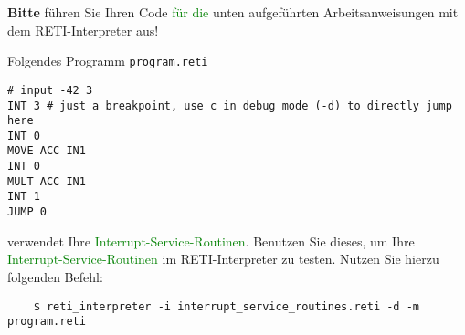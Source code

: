\documentclass{article}
\begin{document}
%



{\LARGE\bfseries\color{red}Bitte} führen Sie Ihren Code \textcolor{green}{für die} unten aufgeführten Arbeitsanweisungen mit dem RETI-Interpreter aus!

Folgendes Programm \texttt{program.reti}
\begin{verbatim}
# input -42 3
INT 3 # just a breakpoint, use c in debug mode (-d) to directly jump here
INT 0
MOVE ACC IN1
INT 0
MULT ACC IN1
INT 1
JUMP 0
\end{verbatim} 
verwendet Ihre \textcolor{green}{Interrupt-Service-Routinen}. Benutzen Sie dieses, um Ihre \textcolor{green}{Interrupt-Service-Routinen} im RETI-Interpreter zu testen.
Nutzen Sie hierzu folgenden Befehl:
\begin{verbatim}
	$ reti_interpreter -i interrupt_service_routines.reti -d -m program.reti
\end{verbatim}

\end{document}
